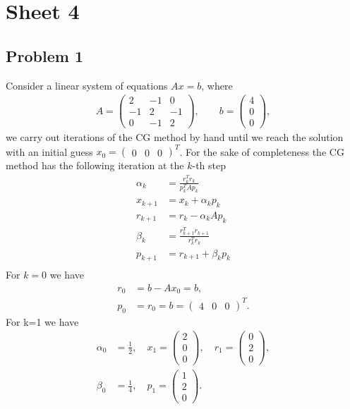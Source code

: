 


\maketitle
\section{Sheet 4}
\subsection{Problem 1}
Consider a linear system of equations $Ax = b$, where
\begin{align}
    A =
    \begin{pmatrix}
        2 & -1 & 0 \\
        -1 & 2 & -1\\
        0 & -1 & 2
    \end{pmatrix}, \qquad
    b =
    \begin{pmatrix}
        4 \\ 0 \\ 0
    \end{pmatrix},
\end{align}
we carry out iterations of the CG method by hand until we reach the
solution with an initial guess $x_0 = \begin{pmatrix} 0 & 0 & 0
\end{pmatrix}^T$. For the sake of completeness the CG method has the following
iteration at the $k$-th step
\begin{align}
    \alpha_k &= \frac{r_k^Tr_k}{p_k^TAp_k}\\
    x_{k+1} &=  x_k + \alpha_k p_k\\
    r_{k+1} &= r_k - \alpha_k A p_k \\
    \beta_{k} &= \frac{r_{k+1}^Tr_{k+1}}{r_{k}^T r_k}\\
    p_{k+1} &= r_{k+1} + \beta_{k}p_k \\
\end{align}
For $k=0$ we have
\begin{align}
    r_0 &= b - Ax_0 = b,\\
    p_0 &= r_0 = b = \begin{pmatrix} 4 & 0 & 0 \end{pmatrix}^T.
\end{align}
For k=1 we have
\begin{align}
    \alpha_0 &= \frac{1}{2}, \quad x_1=\begin{pmatrix} 2 \\ 0 \\0
        \end{pmatrix}, \quad r_1 = \begin{pmatrix} 0 \\ 2 \\0
    \end{pmatrix},\\
    \beta_0 &= \frac{1}{4},\quad p_1 = \begin{pmatrix} 1\\2\\0
    \end{pmatrix}.
\end{align}

